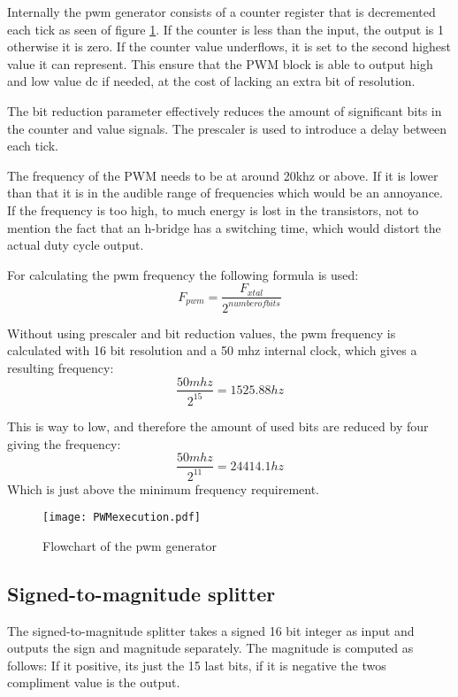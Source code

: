 Internally the pwm generator consists of a counter register that is decremented each tick as seen of figure \ref{fig:pwmchart}. If the counter is less than the input, the output is 1 otherwise it is zero.
If the counter value underflows, it is set to the second highest value it can represent. This ensure that the PWM block is able to output high and low value dc if needed, at the cost of lacking an extra bit of resolution.

The bit reduction parameter effectively reduces the amount of significant bits in the counter and value signals.
The prescaler is used to introduce a delay between each tick.

The frequency of the PWM needs to be at around 20khz or above. If it is lower than that it is in the audible range of frequencies which would be an annoyance. If the frequency is too high, to much energy is lost in the transistors, not to mention the fact that an h-bridge has a switching time, which would distort the actual duty cycle output.

For calculating the pwm frequency the following formula is used: 
\begin{equation}
F_{pwm} = \frac{F_{xtal}}{2^{number of bits}}
\end{equation}

Without using prescaler and bit reduction values, the pwm frequency is calculated with 16 bit resolution and a 50 mhz internal clock, which gives a resulting frequency:
\begin{equation}
\frac{50 mhz}{2^{15}} = 1525.88 hz
\end{equation}

This is way to low, and therefore the amount of used bits are reduced by four giving the frequency:
\begin{equation}
\frac{50 mhz}{2^{11}} = 24414.1 hz
\end{equation}
Which is just above the minimum frequency requirement.

\begin{figure}[htb]
\centering
\texttt{[image: PWMexecution.pdf]}
\caption{Flowchart of the pwm generator}
\label{fig:pwmchart}
\end{figure}

\subsection{Signed-to-magnitude splitter}
The signed-to-magnitude splitter takes a signed 16 bit integer as input and outputs the sign and magnitude separately.
The magnitude is computed as follows:
If it positive, its just the 15 last bits, if it is negative the twos compliment value is the output.

